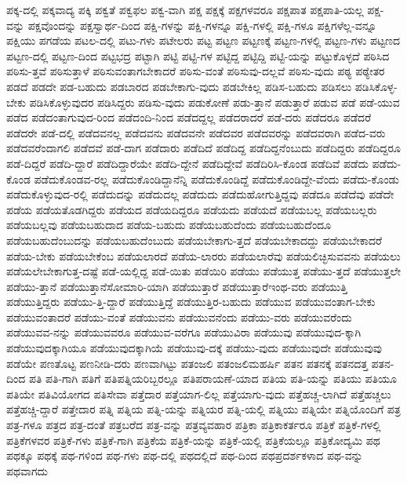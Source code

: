 {ಪಕ್ಕ-ದಲ್ಲಿ
ಪಕ್ಕವಾದ್ಯ
ಪಕ್ಕಿ
ಪಕ್ವತೆ
ಪಕ್ವಫಲ
ಪಕ್ವ-ವಾಗಿ
ಪಕ್ಷ
ಪಕ್ಷಕ್ಕೆ
ಪಕ್ಷಗಳವರೂ
ಪಕ್ಷಪಾತ
ಪಕ್ಷಪಾತಿ-ಯಲ್ಲ
ಪಕ್ಷ-ವನ್ನು
ಪಕ್ಷವೊಂದನ್ನು
ಪಕ್ಷಸ್ವಾರ್ಥ-ದಿಂದ
ಪಕ್ಷಿ-ಗಳನ್ನು
ಪಕ್ಷಿ-ಗಳನ್ನೂ
ಪಕ್ಷಿ-ಗಳಲ್ಲಿ
ಪಕ್ಷಿ-ಗಳೂ
ಪಕ್ಷಿಗಳೆಲ್ಲ-ವನ್ನೂ
ಪಕ್ಷಿಯು
ಪಗಡೆಯ
ಪಟಲ-ದಲ್ಲಿ
ಪಟು-ಗಳು
ಪಟೇಲರು
ಪಟ್ಟ
ಪಟ್ಟಣ
ಪಟ್ಟಣಕ್ಕೆ
ಪಟ್ಟಣ-ಗಳಲ್ಲಿ
ಪಟ್ಟಣ-ಗಳು
ಪಟ್ಟಣದ
ಪಟ್ಟಣ-ದಲ್ಲಿ
ಪಟ್ಟಣ-ದಿಂದ
ಪಟ್ಟಭದ್ರ
ಪಟ್ಟಾಗಿ
ಪಟ್ಟಿ
ಪಟ್ಟಿ-ಗಳ
ಪಟ್ಟಿದ್ದ
ಪಟ್ಟಿದ್ದಿ
ಪಟ್ಟಿ-ಯನ್ನು
ಪಟ್ಟುಕೊಳ್ಳದೆ
ಪಠಿಸಿದ
ಪಠಿಸು-ತ್ತವೆ
ಪಠಿಸುತ್ತಾಳೆ
ಪಠಿಸುವಂತಾಗಬೇಕಾದರೆ
ಪಠಿಸು-ವಂತೆ
ಪಠಿಸುವು-ದಲ್ಲವೆ
ಪಠಿಸು-ವುದು
ಪಠ್ಯ
ಪಠ್ಯೇತರ
ಪಡದೆ
ಪಡದೇ
ಪಡ-ಬಹುದು
ಪಡಬಾರದ
ಪಡಬೇಕಾಗು-ವುದು
ಪಡಬೇಕಿಲ್ಲ
ಪಡಿಸ-ಬಹುದು
ಪಡಿಸಲು
ಪಡಿಸಿಕೊಳ್ಳ-ಬೇಕು
ಪಡಿಸಿಕೊಳ್ಳುವುದರ
ಪಡಿಸಿದ್ದರು
ಪಡಿಸು-ವುದು
ಪಡುಕೋಣೆ
ಪಡು-ತ್ತಾನೆ
ಪಡುತ್ತಾರೆ
ಪಡುವ
ಪಡೆ
ಪಡೆ-ಯುವ
ಪಡೆದ
ಪಡೆದಂತಾಗುವುದ-ರಿಂದ
ಪಡೆದಂದಿ-ನಿಂದ
ಪಡೆದದ್ದಲ್ಲ
ಪಡೆದರಾದರೆ
ಪಡೆ-ದರು
ಪಡೆದರೂ
ಪಡೆದರೆ
ಪಡೆದರೇ
ಪಡೆ-ದಲ್ಲಿ
ಪಡೆದವನಲ್ಲ
ಪಡೆದವನು
ಪಡೆದವನೇ
ಪಡೆದವರ
ಪಡೆದವರನ್ನು
ಪಡೆದವರಾಗಿ
ಪಡೆದ-ವರು
ಪಡೆದವರೆಂದಾಗಲಿ
ಪಡೆದವೆ
ಪಡೆ-ದಾಗ
ಪಡೆದಾರು
ಪಡೆದಿದೆ
ಪಡೆದಿದ್ದ
ಪಡೆದಿದ್ದನೆಂಬುದು
ಪಡೆದಿದ್ದರು
ಪಡೆದಿದ್ದರೂ
ಪಡೆ-ದಿದ್ದರೆ
ಪಡೆದಿ-ದ್ದಾರೆ
ಪಡೆದಿದ್ದಾರೆಯೇ
ಪಡೆದಿ-ದ್ದೇನೆ
ಪಡೆದಿದ್ದೇವೆ
ಪಡೆದಿರಿಸಿ-ಕೊಂಡ
ಪಡೆದಿವೆ
ಪಡೆದು
ಪಡೆದು-ಕೊಂಡ
ಪಡೆದುಕೊಂಡವ-ರಲ್ಲ
ಪಡೆದುಕೊಂಡಿದ್ದಾನೆನ್ನಿ
ಪಡೆದುಕೊಂಡಿದ್ದೆ
ಪಡೆದುಕೊಂಡಿದ್ದೇ-ವೆಂದು
ಪಡೆದು-ಕೊಂಡು
ಪಡೆದುಕೊಳ್ಳುವುದ-ರಲ್ಲಿ
ಪಡೆದುದನ್ನು
ಪಡೆದುದಲ್ಲ
ಪಡೆದುದು
ಪಡೆದುಹೋಗುತ್ತಿದ್ದವು
ಪಡೆದೂ
ಪಡೆದೆವು
ಪಡೆದೇ
ಪಡೆಯ
ಪಡೆಯತೊಡಗಿದ್ದರು
ಪಡೆಯದ
ಪಡೆಯದಿದ್ದರೂ
ಪಡೆಯದು
ಪಡೆಯದೆ
ಪಡೆಯಬಲ್ಲ
ಪಡೆಯಬಲ್ಲರು
ಪಡೆಯಬಲ್ಲವು
ಪಡೆಯಬಹುದಾದ
ಪಡೆಯ-ಬಹುದು
ಪಡೆಯಬಹುದೆಂದು
ಪಡೆಯಬಹುದೆಂದೂ
ಪಡೆಯಬಹುದೆಂಬುದನ್ನು
ಪಡೆಯಬಹುದೆಂಬುದು
ಪಡೆಯಬೇಕಾಗು-ತ್ತದೆ
ಪಡೆಯಬೇಕಾದದ್ದು
ಪಡೆಯಬೇಕಾದರೆ
ಪಡೆಯ-ಬೇಕು
ಪಡೆಯಬೇಕೆಂಬ
ಪಡೆಯಲಾರದೆ
ಪಡೆಯ-ಲಾರರು
ಪಡೆಯಲಾರೆವು
ಪಡೆಯಲಿಚ್ಛಿಸುವವನು
ಪಡೆಯಲು
ಪಡೆಯಲೇಬೇಕಾಗುತ್ತ-ದಷ್ಟೆ
ಪಡೆ-ಯಲ್ಲಿದ್ದ
ಪಡೆ-ಯಿತು
ಪಡೆಯಿರಿ
ಪಡೆಯು
ಪಡೆಯುತ್ತ
ಪಡೆಯು-ತ್ತದೆ
ಪಡೆಯುತ್ತಲೇ
ಪಡೆಯು-ತ್ತಾನೆ
ಪಡೆಯುತ್ತಾನೆಸೋಮಾರಿ-ಯಾಗಿ
ಪಡೆಯುತ್ತಾರೆ
ಪಡೆಯುತ್ತಾರೆಇಂಥ-ವರು
ಪಡೆಯುತ್ತಿ
ಪಡೆಯುತ್ತಿದ್ದರು
ಪಡೆಯು-ತ್ತಿ-ದ್ದಾರೆ
ಪಡೆಯುತ್ತಿದ್ದೆ
ಪಡೆಯುತ್ತಿರ-ಬಹುದು
ಪಡೆಯುವ
ಪಡೆಯುವಂತಾಗ-ಬೇಕು
ಪಡೆಯುವಂತಾದರೆ
ಪಡೆಯು-ವಂತೆ
ಪಡೆಯುವನು
ಪಡೆಯುವನೆಂದು
ಪಡೆಯು-ವರು
ಪಡೆಯುವರೆಂದು
ಪಡೆಯುವವ-ನನ್ನು
ಪಡೆಯುವವರೂ
ಪಡೆಯುವ-ವರೆಗೂ
ಪಡೆಯುವಿರಾ
ಪಡೆಯುವು
ಪಡೆಯುವುದ-ಕ್ಕಾಗಿ
ಪಡೆಯುವುದಕ್ಕಾಗಿಯೂ
ಪಡೆಯುವುದಕ್ಕಾಗಿಯೆ
ಪಡೆಯುವು-ದಕ್ಕೆ
ಪಡೆಯು-ವುದು
ಪಡೆಯುವುದೇ
ಪಡೆಯುವುವು
ಪಡೆಯೇ
ಪಣತೊಟ್ಟ
ಪಣನೀಡಿ-ದರು
ಪಣವಾಗಿಟ್ಟು
ಪತಂಜಲಿ
ಪತಂಜಲಿಮಹರ್ಷಿ
ಪತನ
ಪತನಕ್ಕೆ
ಪತನದತ್ತ
ಪತನ-ದಿಂದ
ಪತಿ
ಪತಿ-ಗಾಗಿ
ಪತಿಗೆ
ಪತಿಪತ್ನಿಯರಿಬ್ಬರಲ್ಲೂ
ಪತಿಪರಾಯಣೆ-ಯಾದ
ಪತಿಯ
ಪತಿ-ಯನ್ನು
ಪತಿಯು
ಪತಿಯೂ
ಪತಿಯೇ
ಪತಿವಿಯೋಗದ
ಪತಿಸೇವಾ
ಪತ್ತೆದಾರ
ಪತ್ತೆಯಾಗ-ಲಿಲ್ಲ
ಪತ್ತೆಯಾಗು-ವುದು
ಪತ್ತೆಹಚ್ಚ-ಲಾಗಿದೆ
ಪತ್ತೆಹಚ್ಚಲು
ಪತ್ತೆಹಚ್ಚಿ-ದ್ದಾರೆ
ಪತ್ತೇದಾರ
ಪತ್ನಿ
ಪತ್ನಿಯ
ಪತ್ನಿ-ಯನ್ನು
ಪತ್ನಿಯರ
ಪತ್ನಿ-ಯಲ್ಲಿ
ಪತ್ನಿಯು
ಪತ್ನಿಯೇ
ಪತ್ನಿಯೊಂದಿಗೆ
ಪತ್ರ
ಪತ್ರ-ಗಳೂ
ಪತ್ರದ
ಪತ್ರ-ದಂತೆ
ಪತ್ರಬರೆದ
ಪತ್ರ-ವನ್ನು
ಪತ್ರವ್ಯವಹಾರ
ಪತ್ರಿಕಾ
ಪತ್ರಿಕಾಕರ್ತರೂ
ಪತ್ರಿಕೆ
ಪತ್ರಿಕೆ-ಗಳಲ್ಲಿ
ಪತ್ರಿಕೆಗಳವರ
ಪತ್ರಿಕೆ-ಗಳು
ಪತ್ರಿಕೆ-ಗಾಗಿ
ಪತ್ರಿಕೆಯ
ಪತ್ರಿಕೆ-ಯನ್ನು
ಪತ್ರಿಕೆ-ಯಲ್ಲಿ
ಪತ್ರಿಕೆಯಲ್ಲೂ
ಪತ್ರಿಕೋದ್ಯಮಿ
ಪಥ
ಪಥಕ್ಕೂ
ಪಥಕ್ಕೆ
ಪಥ-ಗಳಿಂದ
ಪಥ-ಗಳು
ಪಥ-ದಲ್ಲಿ
ಪಥದಲ್ಲಿದೆ
ಪಥ-ದಿಂದ
ಪಥಪ್ರದರ್ಶಕಳಾದ
ಪಥ-ವನ್ನು
ಪಥವಾಗದು
}
